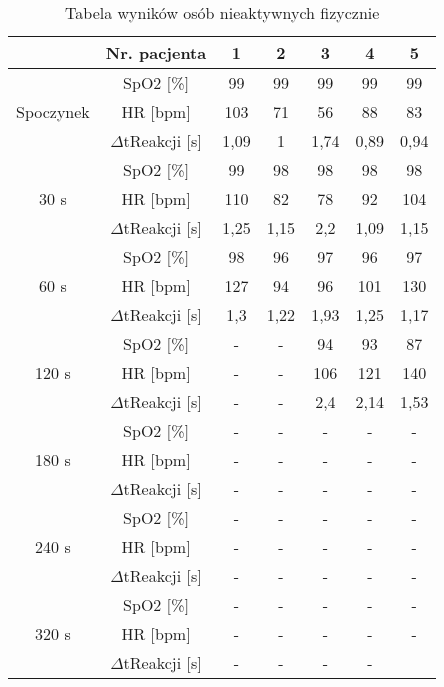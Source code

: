 \begin{table}[ht]
    \centering
    \caption{Tabela wyników osób nieaktywnych fizycznie}
    \begin{tabular}{|c|c|c|c|c|c|c|}
    \hline
                          & Nr. pacjenta        & 1 & 2 & 3 & 4 & 5 \\ \hline
    \multirow{3}{*}{Spoczynek}  & SpO2 $[$\%$]$ & 99   & 99  & 99  & 99  & 99  \\ \cline{2-7} 
                          & HR $[$bpm$]$     & 103  & 71  & 56  & 88  &  83 \\ \cline{2-7} 
                          & $\Delta$tReakcji $[$s$]$  & 1,09  & 1  & 1,74  & 0,89  & 0,94  \\ \hline
    \multirow{3}{*}{30 s}  & SpO2 $[$\%$]$ & 99  & 98  &  98 & 98  &  98 \\ \cline{2-7} 
                          & HR $[$bpm$]$     & 110  &  82 & 78  & 92  & 104  \\ \cline{2-7} 
                          & $\Delta$tReakcji $[$s$]$   & 1,25  & 1,15  & 2,2  & 1,09  & 1,15  \\ \hline
    \multirow{3}{*}{60 s}  & SpO2 $[$\%$]$ & 98  & 96  & 97  & 96  & 97  \\ \cline{2-7} 
                          & HR $[$bpm$]$     & 127  & 94  & 96  & 101  & 130  \\ \cline{2-7} 
                          & $\Delta$tReakcji $[$s$]$   & 1,3  & 1,22  & 1,93  & 1,25  & 1,17  \\ \hline
    \multirow{3}{*}{120 s}  & SpO2 $[$\%$]$ & -  & -  & 94  & 93  & 87  \\ \cline{2-7} 
                          & HR $[$bpm$]$     & -  & -  & 106  & 121  & 140  \\ \cline{2-7} 
                          & $\Delta$tReakcji $[$s$]$   & -  & -  & 2,4  & 2,14  & 1,53  \\ \hline
    \multirow{3}{*}{180 s} & SpO2 $[$\%$]$ &  - & -  & -  & -  & -  \\ \cline{2-7} 
                          & HR $[$bpm$]$     & -  & -  & -  & -  & - \\ \cline{2-7} 
                          & $\Delta$tReakcji $[$s$]$   & -  & -  & -  & -  & -  \\ \hline
    \multirow{3}{*}{240 s} & SpO2 $[$\%$]$ & -  &  - &  - & -  & -  \\ \cline{2-7} 
                          & HR $[$bpm$]$     & -  & -  & -  & -  &  - \\ \cline{2-7} 
                          & $\Delta$tReakcji $[$s$]$   & -  & -  & -  & -  & -  \\ \hline
    \multirow{3}{*}{320 s} & SpO2 $[$\%$]$ & -  &  - &  - & -  & -  \\ \cline{2-7} 
                          & HR $[$bpm$]$     & -  & -  & -  & -  &  - \\ \cline{2-7} 
                          & $\Delta$tReakcji $[$s$]$   & -  & -  & -  & -  &   \\ \hline
    \end{tabular}
    \end{table}

